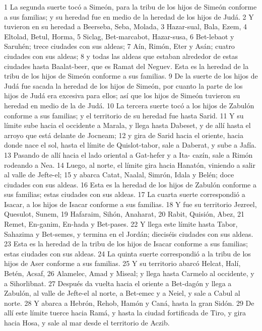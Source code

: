 1 La segunda suerte tocó a Simeón, para la tribu de los hijos de Simeón conforme a sus familias; y su heredad fue en medio de la heredad de los hijos de Judá.
2 Y tuvieron en su heredad a Beerseba, Seba, Molada,
3 Hazar-sual, Bala, Ezem,
4 Eltolad, Betul, Horma,
5 Siclag, Bet-marcabot, Hazar-susa,
6 Bet-lebaot y Saruhén; trece ciudades con sus aldeas;
7 Aín, Rimón, Eter y Asán; cuatro ciudades con sus aldeas;
8 y todas las aldeas que estaban alrededor de estas ciudades hasta Baalat-beer, que es Ramat del Neguev. Esta es la heredad de la tribu de los hijos de Simeón conforme a sus familias. 
9 De la suerte de los hijos de Judá fue sacada la heredad de los hijos de Simeón, por cuanto la parte de los hijos de Judá era excesiva para ellos; así que los hijos de Simeón tuvieron su heredad en medio de la de Judá.
10 La tercera suerte tocó a los hijos de Zabulón conforme a sus familias; y el territorio de su heredad fue hasta Sarid.
11 Y su límite sube hacia el occidente a Marala, y llega hasta Dabeset, y de allí hasta el arroyo que está delante de Jocneam;
12 y gira de Sarid hacia el oriente, hacia donde nace el sol, hasta el límite de Quislot-tabor, sale a Daberat, y sube a Jafía.
13 Pasando de allí hacia el lado oriental a Gat-hefer y a Ita- cazín, sale a Rimón rodeando a Nea.
14 Luego, al norte, el límite gira hacia Hanatón, viniendo a salir al valle de Jefte-el;
15 y abarca Catat, Naalal, Simrón, Idala y Belén; doce ciudades con sus aldeas.
16 Esta es la heredad de los hijos de Zabulón conforme a sus familias; estas ciudades con sus aldeas.
17 La cuarta suerte correspondió a Isacar, a los hijos de Isacar conforme a sus familias.
18 Y fue su territorio Jezreel, Quesulot, Sunem,
19 Hafaraim, Sihón, Anaharat,
20 Rabit, Quisión, Abez,
21 Remet, En-ganim, En-hada y Bet-pases.
22 Y llega este límite hasta Tabor, Sahazima y Bet-semes, y termina en el Jordán; dieciséis ciudades con sus aldeas.
23 Esta es la heredad de la tribu de los hijos de Isacar conforme a sus familias; estas ciudades con sus aldeas.
24 La quinta suerte correspondió a la tribu de los hijos de Aser conforme a sus familias.
25 Y su territorio abarcó Helcat, Halí, Betén, Acsaf,
26 Alamelec, Amad y Miseal; y llega hasta Carmelo al occidente, y a Sihorlibnat.
27 Después da vuelta hacia el oriente a Bet-dagón y llega a Zabulón, al valle de Jefte-el al norte, a Bet-emec y a Neiel, y sale a Cabul al norte.
28 Y abarca a Hebrón, Rehob, Hamón y Caná, hasta la gran Sidón.
29 De allí este límite tuerce hacia Ramá, y hasta la ciudad fortificada de Tiro, y gira hacia Hosa, y sale al mar desde el territorio de Aczib.
